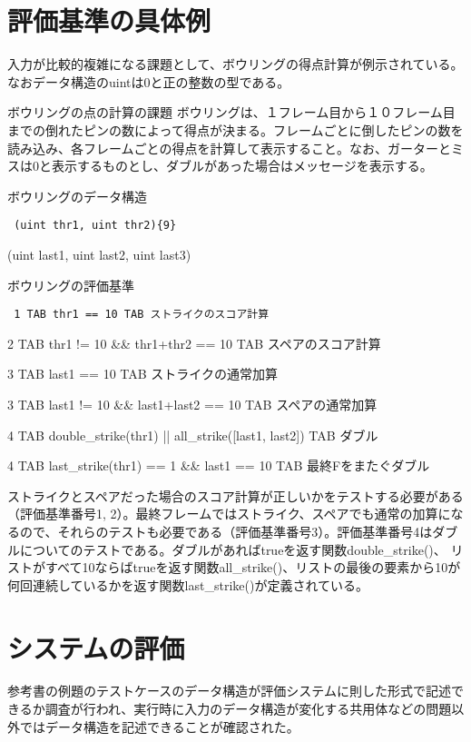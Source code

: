 \documentclass{tpu-sotu}
\begin{document}
\section{評価基準の具体例}
入力が比較的複雑になる課題として、ボウリングの得点計算が例示されている。なおデータ構造のuintは0と正の整数の型である。
\begin{itembox}[l]{ボウリングの点の計算の課題}
ボウリングは、１フレーム目から１０フレーム目までの倒れたピンの数によって得点が決まる。フレームごとに倒したピンの数を読み込み、各フレームごとの得点を計算して表示すること。なお、ガーターとミスは0と表示するものとし、ダブルがあった場合はメッセージを表示する。
\end{itembox}
\begin{minipage}[b]{.7\textwidth}
\begin{itembox}[l]{ボウリングのデータ構造}
{\tt
(uint thr1, uint thr2)\{9\}

(uint last1, uint last2, uint last3)
}
\end{itembox}
\end{minipage}
\begin{itembox}[l]{ボウリングの評価基準}
{\tt
1 TAB thr1 == 10 TAB ストライクのスコア計算

2 TAB thr1 != 10 \&\& thr1+thr2 == 10 TAB スペアのスコア計算

3 TAB last1 == 10 TAB ストライクの通常加算

3 TAB last1 != 10  \&\& last1+last2 == 10 TAB スペアの通常加算

4 TAB double\_strike(thr1) || all\_strike([last1, last2]) TAB ダブル

4 TAB last\_strike(thr1) == 1 \&\& last1 == 10 TAB 最終Fをまたぐダブル
}
\end{itembox}

ストライクとスペアだった場合のスコア計算が正しいかをテストする必要がある（評価基準番号1, 2）。最終フレームではストライク、スペアでも通常の加算になるので、それらのテストも必要である（評価基準番号3）。評価基準番号4はダブルについてのテストである。ダブルがあればtrueを返す関数double\_strike()、 リストがすべて10ならばtrueを返す関数all\_strike()、リストの最後の要素から10が何回連続しているかを返す関数last\_strike()が定義されている。
\section{システムの評価}
参考書の例題のテストケースのデータ構造が評価システムに則した形式で記述できるか調査が行われ、実行時に入力のデータ構造が変化する共用体などの問題以外ではデータ構造を記述できることが確認された。
\end{document}
